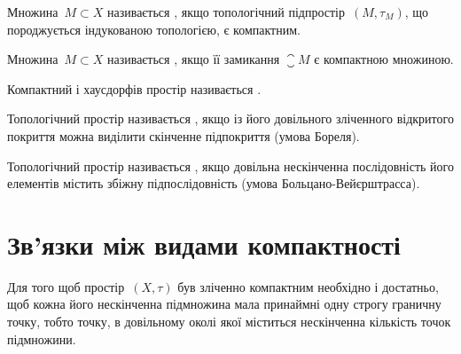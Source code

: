 \begin{definition}
Множина~$M \subset X$ називається , якщо топологічний підпростір~$(M, \tau_M)$,
що породжується індукованою топологією, є компактним.
\end{definition}

\begin{definition}
Множина~$M \subset X$ називається , якщо її замикання
$\closure M$ є компактною множиною.
\end{definition}

\begin{definition}
Компактний і хаусдорфів простір називається
.
\end{definition}

\begin{definition}
Топологічний простір називається
, якщо із його довільного зліченного
відкритого покриття можна виділити скінченне
підпокриття (умова Бореля).
\end{definition}

\begin{definition}
Топологічний простір називається
, якщо довільна нескінченна
послідовність його елементів містить збіжну
підпослідовність (умова Больцано-Вейєрштрасса).
\end{definition}

\section{Зв'язки між видами компактності}

\begin{theorem}
Для того щоб простір~$(X, \tau)$ був зліченно
компактним необхідно і достатньо, щоб кожна його
нескінченна підмножина мала принаймні одну строгу
граничну точку, тобто точку, в довільному околі якої
міститься нескінченна кількість точок підмножини.
\end{theorem}


